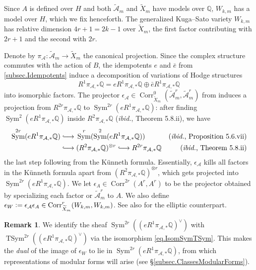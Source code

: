 \documentclass[a4paper]{amsart}
\numberwithin{equation}{section}
\theoremstyle{definition}
\newtheorem{remark}[theorem]{Remark}
\newcommand{\Q}{\mathbb{Q}}
\newcommand{\defeq}{\vcentcolon=}
\DeclareMathOperator{\TSym}{TSym}
\DeclareMathOperator{\Sym}{Sym}
\DeclareMathOperator{\Corr}{Corr}
\newcommand{\longmono}{\mbox{\;$\lhook\joinrel\longrightarrow$\;}}
\begin{document}
Since $A$ is defined over $H$ and both $\widetilde{\mathcal{A}}_m$ and $\widetilde{X}_m$ have models over $\Q$, $W_{k,m}$ has a model over $H$, which we fix henceforth. The generalized Kuga--Sato variety $W_{k,m}$ has relative dimension $4r+1=2k-1$ over $\widetilde{X}_m$, the first factor contributing with $2r+1$ and the second with $2r$.

Denote by $\pi_{\mathcal{A}}\colon\widetilde{\mathcal{A}}_m\to \widetilde{X}_m$ the canonical projection. Since the complex structure commutes with the action of $B$, the idempotents $e$ and $\bar{e}$ from \ref{subsec.Idempotents} induce a decomposition of variations of Hodge structures \[R^1\pi_{\mathcal{A},*}\Q=eR^1\pi_{\mathcal{A},*}\Q\oplus\bar{e}R^1\pi_{\mathcal{A},*}\Q\] into isomorphic factors. The projector $\epsilon_{\mathcal{A}}\in\Corr_{\widetilde{X}_m}^0(\widetilde{\mathcal{A}}_m^{r},\widetilde{\mathcal{A}}_m^{r})$ from \cite[Theorem 5.8.iii]{Besser} induces a projection from $R^{2r}\pi_{\mathcal{A},*}\Q$ to $\Sym^{2r}(eR^1\pi_{\mathcal{A},*}\Q)$: after finding $\Sym^{2}(eR^1\pi_{\mathcal{A},*}\Q)$ inside $R^2\pi_{\mathcal{A},*}\Q$ (\textit{ibid.}, Theorem 5.8.ii), we have
\begin{align*}
\Sym^{2r}(eR^1\pi_{\mathcal{A},*}\Q)&\longmono\Sym^{r}(\Sym^2(eR^1\pi_{\mathcal{A},*}\Q))&\text{(\textit{ibid.}, Proposition 5.6.vii)}\\
&\longmono (R^2\pi_{\mathcal{A},*}\Q)^{\otimes r}\longmono R^{2r}\pi_{\mathcal{A},*}\Q&\text{(\textit{ibid.}, Theorem 5.8.ii)}\\
\end{align*}
the last step following from the Künneth formula. Essentially, $\epsilon_\mathcal{A}$ kills all factors in the Künneth formula apart from $(R^2\pi_{\mathcal{A},*}\Q)^{\otimes r}$, which gets projected into $\Sym^{2r}(eR^1\pi_{\mathcal{A},*}\Q)$. We let $\epsilon_A\in\Corr^{2r}(A^r,A^r)$ to be the projector obtained by specializing each factor or $\widetilde{\mathcal{A}}_m^r$ to $A$. We also define $\epsilon_W\defeq\epsilon_{\mathcal{A}}\epsilon_A\in\Corr^r_{\widetilde{X}_m}(W_{k,m},W_{k,m})$. See also \cite[(1.4.4), (2.1.2)]{BertoliniDarmonPrasanna} for the elliptic counterpart.

\begin{remark}\label{rem.TSym}
We identify the sheaf $\Sym^{2r}\left((eR^1\pi_{\mathcal{A},*}\Q)^\vee\right)$ with $\TSym^{2r}\left((eR^1\pi_{\mathcal{A},*}\Q)^\vee\right)$ via the isomorphism \eqref{eq.IsomSymTSym}. This makes the \textit{dual} of the image of $\epsilon_W$ to lie in $\Sym^{2r}(eR^1\pi_{\mathcal{A},*}\Q)$, from which representations of modular forms will arise (see \S\ref{subsec.ClassesModularForms}).
\end{remark}
\end{document}
